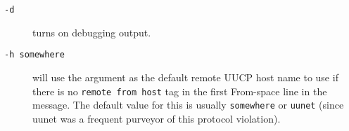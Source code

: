 \begin{description}
\item[ {\tt -d} ] \mbox{}

turns on debugging output.



\item[ {\tt -h somewhere} ] \mbox{}

will use the argument as the 
default remote UUCP host name to use if there is no {\tt remote from host}
tag in the first From-space line in  the message.
The  default value for this is usually {\tt somewhere} or
{\tt uunet} (since uunet was a frequent purveyor of this
protocol violation).

\end{description}

